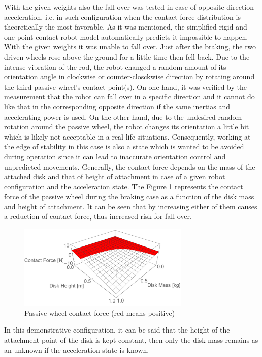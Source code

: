 \documentclass[12pt,english]{article}
\begin{document}
With the given weights also the fall over was tested in case of opposite direction acceleration, i.e. in such configuration when the contact force distribution is theoretically the most favorable. As it was mentioned, the simplified rigid and one-point contact robot model automatically predicts it impossible to happen. With the given weights it was unable to fall over. Just after the braking, the two driven wheels rose above the ground for a little time then fell back. Due to the intense vibration of the rod, the robot changed a random amount of its orientation angle in clockwise or counter-closckwise direction by rotating around the third passive wheel's contact point(s). On one hand, it was verified by the measurement that the robot can fall over in a specific direction and it cannot do like that in the corresponding opposite direction if the same inertias and accelerating power is used. On the other hand, due to the undesired random rotation around the passive wheel, the robot changes its orientation a little bit which is likely not acceptable in a real-life situations. Consequently, working at the edge of stability in this case is also a state which is wanted to be avoided during operation since it can lead to inaccurate orientation control and unpredicted movements. Generally, the contact force depends on the mass of the attached disk and that of height of attachment in case of a given robot configuration and the acceleration state. The Figure \ref{contactForce2D} represents the contact force of the passive wheel during the braking case as a function of the disk mass and height of attachment. It can be seen that by increasing either of them causes a reduction of contact force, thus increased risk for fall over.
\begin{figure}[htb!]
	\centering
	\includegraphics[height=4cm]{figures/contactForce2D_1}
	\caption{Passive wheel contact force (red means positive)}
	\label{contactForce2D}
\end{figure}


In this demonstrative configuration, it can be said that the height of the attachment point of the disk is kept constant, then only the disk mass remains as an unknown if the acceleration state is known.
\end{document}
